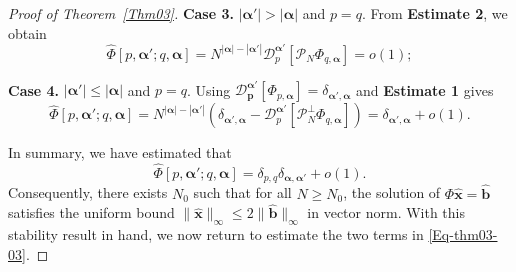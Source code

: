 \documentclass{sn-jnl}%
\numberwithin{equation}{section}
\theoremstyle{thmstyleone}%
\theoremstyle{thmstyletwo}%
\theoremstyle{thmstylethree}%
\begin{document}
\begin{proof}[Proof of Theorem~\ref{Thm03}]
    \textbf{Case 3.} $|\bm \alpha'| > |\bm \alpha|$ and $p = q$. From  \textbf{Estimate 2}, we obtain
    \[
        \hat\Phi[p,\bm \alpha';q,\bm \alpha] =  N^{|\bm \alpha|-|\bm \alpha'|}\mathcal{D}^{\bm \alpha'}_p[\mathcal{P}_N\Phi_{q,\bm \alpha}] = o(1);
    \]
    
    \textbf{Case 4.} $|\bm \alpha'| \leq |\bm \alpha|$ and $p = q$. 
    Using $\mathcal{D}^{\bm \alpha'}_{\bm p}[\Phi_{p,\bm \alpha}]=\delta_{\bm \alpha',\bm \alpha}$ and  \textbf{Estimate 1} gives
    \[
        \hat\Phi[p,\bm \alpha';q,\bm \alpha] =  N^{|\bm \alpha|-|\bm \alpha'|}\left(\delta_{\bm \alpha',\bm \alpha}-\mathcal{D}^{\bm \alpha'}_p[\mathcal{P}^\perp_N\Phi_{q,\bm \alpha}]\right) =\delta_{\bm \alpha',\bm \alpha} + o(1).
    \]

    In summary, we have estimated that
    \[
        \hat\Phi[p,\bm \alpha';q,\bm \alpha] = \delta_{p,q}\delta_{\bm \alpha,\bm \alpha'}+o(1).
    \]
    Consequently, there exists $N_0$ such that for all $N\geq N_0$,  the solution of $\Phi \bm{\hat{x}} =\bm{\hat{b}} $ satisfies the uniform bound $\| \bm{\hat{x}}\|_{\infty} \leq 2\bigl\| \bm{\hat{b}}\|_{\infty}$ in vector norm. With this stability result in hand, we now return to estimate the two terms in \eqref{Eq-thm03-03}.
    

\end{proof}
\end{document}
